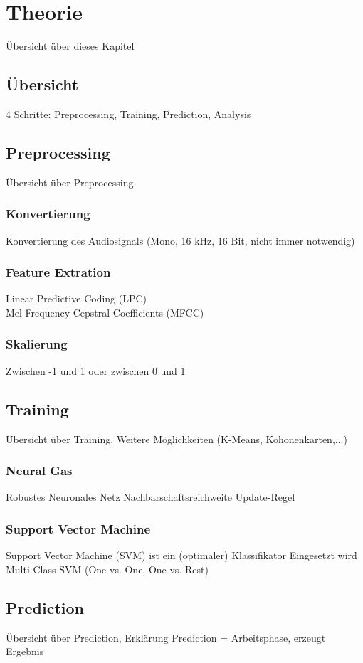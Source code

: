 \chapter{Theorie}
Übersicht über dieses Kapitel

\section{Übersicht}
4 Schritte: Preprocessing, Training, Prediction, Analysis

\section{Preprocessing}
Übersicht über Preprocessing
\subsection{Konvertierung}
Konvertierung des Audiosignals (Mono, 16 kHz, 16 Bit, nicht immer notwendig)
\subsection{Feature Extration}
Linear Predictive Coding (LPC)\\
Mel Frequency Cepstral Coefficients (MFCC)
\subsection{Skalierung}
Zwischen -1 und 1 oder zwischen 0 und 1

\section{Training}
Übersicht über Training, Weitere Möglichkeiten (K-Means, Kohonenkarten,...)
\subsection{Neural Gas}
Robustes Neuronales Netz
Nachbarschaftsreichweite
Update-Regel
\subsection{Support Vector Machine}
Support Vector Machine (SVM) ist ein (optimaler) Klassifikator
Eingesetzt wird Multi-Class SVM (One vs. One, One vs. Rest)

\section{Prediction}
Übersicht über Prediction, Erklärung Prediction = Arbeitsphase, erzeugt Ergebnis
